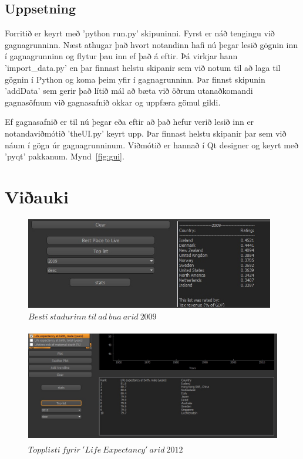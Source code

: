 \documentclass[paper=a4, fontsize=11pt]{scrartcl}
\begin{document}
\subsection{Uppsetning}
Forritið er keyrt með 'python run.py' skipuninni. Fyrst er náð tengingu við gagnagrunninn. Næst athugar það hvort notandinn hafi nú þegar lesið gögnin inn í gagnagrunninn og flytur þau inn ef það á eftir. Þá virkjar hann 'import\_data.py' en þar finnast helstu skipanir sem við notum til að laga til gögnin í Python og koma þeim yfir í gagnagrunninn. Þar finnst skipunin 'addData' sem gerir það lítið mál að bæta við öðrum utanaðkomandi gagnasöfnum við gagnasafnið okkar og uppfæra gömul gildi.\par
Ef gagnasafnið er til nú þegar eða eftir að það hefur verið lesið inn er notandaviðmótið 'theUI.py' keyrt upp. Þar finnast helstu skipanir þar sem við náum í gögn úr gagnagrunninum. Viðmótið er hannað í Qt designer og keyrt með 'pyqt' pakkanum. Mynd~\ref{fig:gui}.

\newpage

\section{Viðauki}

\begin{figure}[H]
\begin{center}
\includegraphics[height=40mm]{images/best.jpg}
\caption{$ Besti\ stadurinn\ til\ ad\ bua\ arid\ 2009 $\label{fig:best}}
\end{center}
\end{figure}

\begin{figure}[H]
\begin{center}
\includegraphics[height=50mm]{images/topList_life.jpg}
\caption{$ Topplisti\ fyrir\ 'Life\ Expectancy'\ arid\ 2012 $\label{fig:topp}}
\end{center}
\end{figure}
\end{document}
